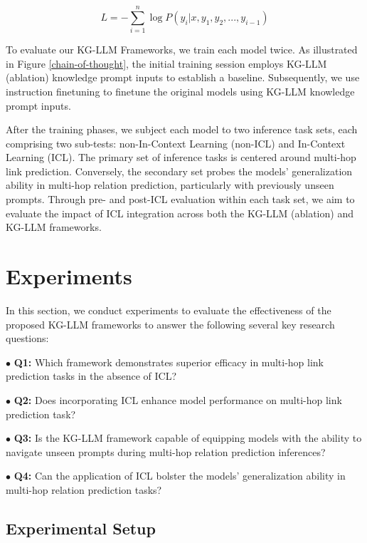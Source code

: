 \documentclass[pmlr]{jmlr}%
\begin{document}
\begin{equation}
\label{eq:1}
L = -\sum_{i=1}^{n} \log P(y_i | x, y_1, y_2, ..., y_{i-1})
\end{equation}

To evaluate our KG-LLM Frameworks, we train each model twice. As illustrated in Figure \ref{chain-of-thought}, the initial training session employs KG-LLM (ablation) knowledge prompt inputs to establish a baseline. Subsequently, we use instruction finetuning to finetune the original models using KG-LLM knowledge prompt inputs.

After the training phases, we subject each model to two inference task sets, each comprising two sub-tests: non-In-Context Learning (non-ICL) and In-Context Learning (ICL). The primary set of inference tasks is centered around multi-hop link prediction. Conversely, the secondary set probes the models' generalization ability in multi-hop relation prediction, particularly with previously unseen prompts. Through pre- and post-ICL evaluation within each task set, we aim to evaluate the impact of ICL integration across both the KG-LLM (ablation) and KG-LLM frameworks.


\section{Experiments}

In this section, we conduct experiments to evaluate the effectiveness of the proposed KG-LLM frameworks to answer the following several key research questions:

$\bullet$ \textbf{Q1:} Which framework demonstrates superior efficacy in multi-hop link prediction tasks in the absence of ICL?

$\bullet$ \textbf{Q2:} Does incorporating ICL enhance model performance on multi-hop link prediction task?

$\bullet$ \textbf{Q3:} Is the KG-LLM framework capable of equipping models with the ability to navigate unseen prompts during multi-hop relation prediction inferences?

$\bullet$ \textbf{Q4:} Can the application of ICL bolster the models' generalization ability in multi-hop relation prediction tasks?




\subsection{Experimental Setup}
\end{document}
